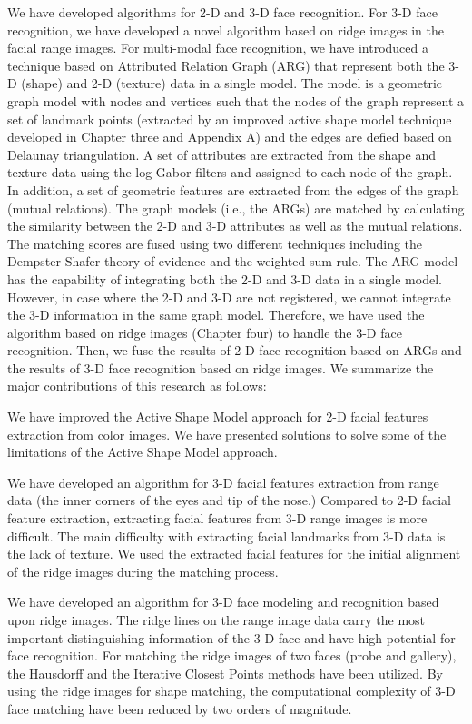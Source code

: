 We have developed algorithms for 2-D and 3-D face recognition. For
3-D face recognition, we have developed a novel algorithm based on
ridge images in the facial range images. For multi-modal face
recognition, we have introduced a technique based on Attributed
Relation Graph (ARG) that represent both the 3-D (shape) and 2-D
(texture) data in a single model. The model is a geometric graph
model with nodes and vertices such that the nodes of the graph
represent a set of landmark points (extracted by an improved active
shape model technique developed in Chapter three and Appendix A) and
the edges are defied based on Delaunay triangulation. A set of
attributes are extracted from the shape and texture data using the
log-Gabor filters and assigned to each node of the graph. In
addition, a set of geometric features are extracted from the edges
of the graph (mutual relations). The graph models (i.e., the ARGs)
are matched by calculating the similarity between the 2-D and 3-D
attributes as well as the mutual relations. The matching scores are
fused using two different techniques including the Dempster-Shafer
theory of evidence and the weighted sum rule. The ARG model has the
capability of integrating both the 2-D and 3-D data in a single
model. However, in case where the 2-D and 3-D are not registered, we
cannot integrate the 3-D information in the same graph model.
Therefore, we have used the algorithm based on ridge images (Chapter
four) to handle the 3-D face recognition. Then, we fuse the results
of 2-D face recognition based on ARGs and the results of 3-D face
recognition based on ridge images. We summarize the major
contributions of this research as follows:

\bi
\item
We have improved the Active Shape Model approach for 2-D facial
features extraction from color images. We have presented solutions
to solve some of the limitations of the Active Shape Model approach.

\item
We have developed an algorithm for 3-D facial features extraction
from range data (the inner corners of the eyes and tip of the nose.)
Compared to 2-D facial feature extraction, extracting facial
features from 3-D range images is more difficult. The main
difficulty with extracting facial landmarks from 3-D data is the
lack of texture. We used the extracted facial features for the
initial alignment of the ridge images during the matching process.

\item
We have developed an algorithm for 3-D face modeling and recognition
based upon ridge images. The ridge lines on the range image data
carry the most important distinguishing information of the 3-D face
and have high potential for face recognition. For matching the ridge
images of two faces (probe and gallery), the Hausdorff and the
Iterative Closest Points methods have been utilized. By using the
ridge images for shape matching, the computational complexity of 3-D
face matching have been reduced by two orders of magnitude.

